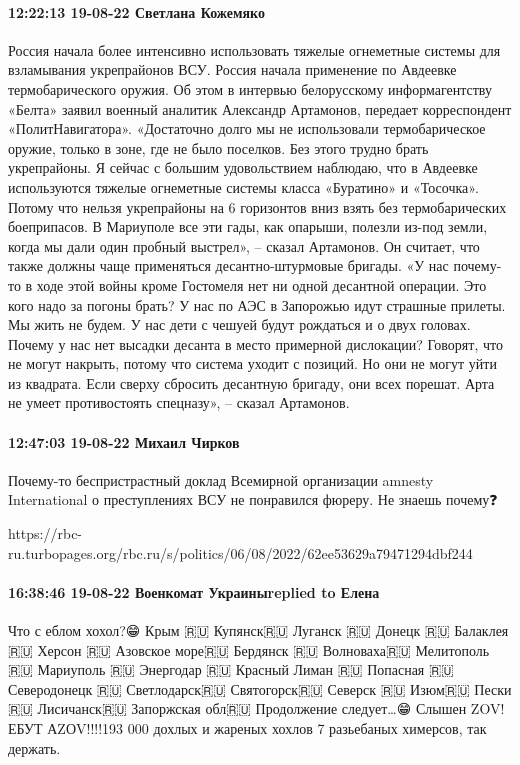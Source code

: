 \paragraph{12:22:13 19-08-22 Светлана Кожемяко}

Россия начала более интенсивно использовать тяжелые огнеметные системы
для взламывания укрепрайонов ВСУ.
Россия начала применение по Авдеевке термобарического оружия.
Об этом в интервью белорусскому информагентству «Белта» заявил военный аналитик Александр Артамонов, передает корреспондент «ПолитНавигатора».
«Достаточно долго мы не использовали термобарическое оружие, только в зоне, где не было поселков. Без этого трудно брать укрепрайоны. Я сейчас с большим удовольствием наблюдаю, что в Авдеевке используются тяжелые огнеметные системы класса «Буратино» и «Тосочка».
Потому что нельзя укрепрайоны на 6 горизонтов вниз взять без термобарических боеприпасов. В Мариуполе все эти гады, как опарыши, полезли из-под земли, когда мы дали один пробный выстрел», – сказал Артамонов.
Он считает, что также должны чаще применяться десантно-штурмовые бригады.
«У нас почему-то в ходе этой войны кроме Гостомеля нет ни одной десантной операции. Это кого надо за погоны брать? У нас по АЭС в Запорожью идут страшные прилеты. Мы жить не будем. У нас дети с чешуей будут рождаться и о двух головах.
Почему у нас нет высадки десанта в место примерной дислокации? Говорят, что не могут накрыть, потому что система уходит с позиций. Но они не могут уйти из квадрата. Если сверху сбросить десантную бригаду, они всех порешат. Арта не умеет противостоять спецназу», – сказал Артамонов.

\paragraph{12:47:03 19-08-22 Михаил Чирков}

Почему-то беспристрастный доклад Всемирной организации amnesty International о
преступлениях ВСУ не понравился фюреру. Не знаешь почему❓

https://rbc-ru.turbopages.org/rbc.ru/s/politics/06/08/2022/62ee53629a79471294dbf244

\paragraph{16:38:46 19-08-22 Военкомат Украиныreplied to Елена}

Что с еблом хохол?😁
Крым 🇷🇺
Купянск🇷🇺
Луганск 🇷🇺
Донецк 🇷🇺
Балаклея 🇷🇺
Херсон 🇷🇺
Азовское море🇷🇺
Бердянск 🇷🇺 Волноваха🇷🇺
Мелитополь 🇷🇺
Мариуполь 🇷🇺
Энергодар 🇷🇺
Красный Лиман 🇷🇺
Попасная 🇷🇺
Северодонецк 🇷🇺
Светлодарск🇷🇺 Святогорск🇷🇺
Северск 🇷🇺
Изюм🇷🇺
Пески🇷🇺
Лисичанск🇷🇺
Запоржская обл🇷🇺
Продолжение следует…😁
Слышен ZOV! ЕБУТ АZОV!!!!193 000 дохлых и жареных хохлов 7 разьебаных химерсов, так держать. 💪🇷🇺


